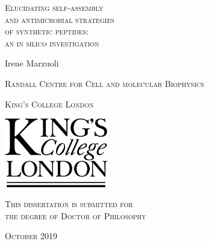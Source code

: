


\thispagestyle{empty}

\begin{center}


{\textsc {\Huge Elucidating self-assembly}}\\
%
\vspace{.15in}
%
{\textsc {\Huge and antimicrobial strategies}}\\
%
\vspace{.15in}
%
{\textsc {\Huge of synthetic peptides:}}\\
%
\vspace{.15in}
%
{\textsc {\Huge an in silico investigation}}
%
\vspace{1.5in}

{\Large Irene Marzuoli}

\vspace{.4in}

{\textsc {\large Randall Centre for Cell and molecular Biophysics}}

\vspace{0.15in}

{\textsc {\large King's College London}}

\vspace{1in}
\includegraphics[height=3cm]{KCL_logo.pdf}

\vspace{1in}

{\textsc {\large This dissertation is submitted for \\ 
the degree of Doctor of Philosophy}}

\vspace{0.5in}

{\textsc {\large October 2019}}

\end{center}

